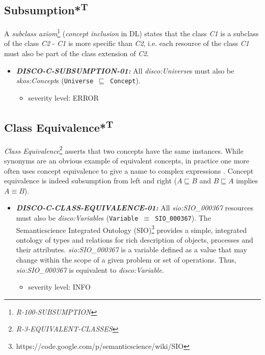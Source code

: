 \documentclass{llncs}
\newcommand{\ms}[1]{\texttt{#1}}
\begin{document}
\subsection{Subsumption*\textsuperscript{T}}

A \emph{subclass axiom}\footnote{{\em R-100-SUBSUMPTION}} ({\em concept inclusion} in DL) states that the class \emph{C1} is a subclass of the class \emph{C2} - \emph{C1} is more specific than \emph{C2}, 
i.e. each resource of the class \emph{C1} must also be part of the class extension of \emph{C2}.

\begin{itemize}
	\item \textbf{{\em DISCO-C-SUBSUMPTION-01:}} 
All {\em disco:Universe}s must also be {\em skos:Concept}s (\ms{Universe $\sqsubseteq$ Concept}).
	\begin{itemize}
		\item severity level: ERROR
	\end{itemize}
\end{itemize}

\subsection{Class Equivalence*\textsuperscript{T}}

{\em Class Equivalence}\footnote{{\em R-3-EQUIVALENT-CLASSES}} asserts that two concepts have the same instances.
While synonyms are an obvious example of equivalent concepts, in practice one more
often uses concept equivalence to give a name to complex expressions \cite{Kroetzsch2012}.
Concept equivalence is indeed subsumption from left and right ($A \sqsubseteq B$ and $B \sqsubseteq A$ implies $A \equiv B$).

\begin{itemize}
	\item \textbf{{\em DISCO-C-CLASS-EQUIVALENCE-01:}}
All {\em sio:SIO\_000367} resources must also be {\em disco:Variable}s (\ms{Variable $\equiv$ SIO\_000367}).
The Semanticscience Integrated Ontology (SIO)\footnote{https://code.google.com/p/semanticscience/wiki/SIO} provides a simple, integrated ontology of types and relations for rich description of objects, processes and their attributes.
{\em sio:SIO\_000367} is a variable defined as a value that may change within the scope of a given problem or set of operations.
Thus, {\em sio:SIO\_000367} is equivalent to {\em disco:Variable}.
\begin{itemize}
	\item severity level: INFO
\end{itemize}
\end{itemize}
\end{document}
